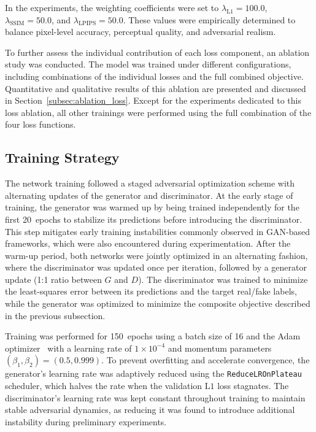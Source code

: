 In the experiments, the weighting coefficients were set to
$\lambda_{\text{L1}} = 100.0$, 
$\lambda_{\text{SSIM}} = 50.0$, and 
$\lambda_{\text{LPIPS}} = 50.0$.
These values were empirically determined to balance pixel-level accuracy, perceptual quality, and adversarial realism. 

To further assess the individual contribution of each loss component, an ablation study was conducted. The model was trained under different configurations, including combinations of the individual losses and the full combined objective. Quantitative and qualitative results of this ablation are presented and discussed in Section~\ref{subsec:ablation_loss}. Except for the experiments dedicated to this loss ablation, all other trainings were performed using the full combination of the four loss functions.

\subsection{Training Strategy}
The network training followed a staged adversarial optimization scheme with alternating updates of the generator and discriminator. At the early stage of training, the generator was warmed up by being trained independently for the first 20~epochs to stabilize its predictions before introducing the discriminator. This step mitigates early training instabilities commonly observed in GAN-based frameworks, which were also encountered during experimentation. After the warm-up period, both networks were jointly optimized in an alternating fashion, where the discriminator was updated once per iteration, followed by a generator update (1:1 ratio between $G$ and $D$). The discriminator was trained to minimize the least-squares error between its predictions and the target real/fake labels, while the generator was optimized to minimize the composite objective described in the previous subsection.

Training was performed for 150~epochs using a batch size of 16 and the Adam optimizer~\cite{adam_optimizer_2017} with a learning rate of $1\times10^{-4}$ and momentum parameters $(\beta_1, \beta_2) = (0.5, 0.999)$. To prevent overfitting and accelerate convergence, the generator’s learning rate was adaptively reduced using the \texttt{ReduceLROnPlateau} scheduler, which halves the rate when the validation $\mathrm{L1}$ loss stagnates. The discriminator’s learning rate was kept constant throughout training to maintain stable adversarial dynamics, as reducing it was found to introduce additional instability during preliminary experiments.

